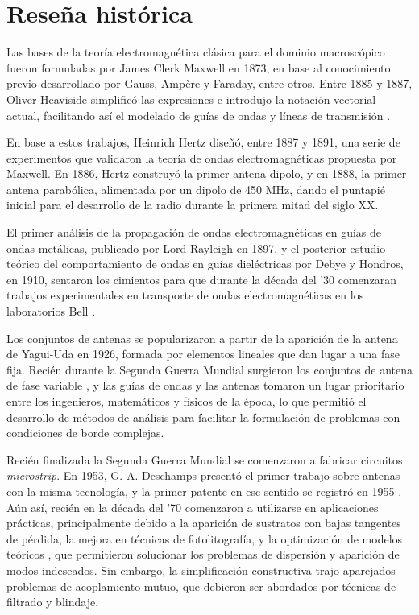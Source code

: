 

\section{Reseña histórica}
\label{sec_intro_resenia}

Las bases de la teoría electromagnética clásica para el dominio macroscópico fueron formuladas por James Clerk Maxwell en 1873, en base al conocimiento previo desarrollado por Gauss, Ampère y Faraday, entre otros. Entre 1885 y 1887, Oliver Heaviside simplificó las expresiones e introdujo la notación vectorial actual, facilitando así el modelado de guías de ondas y líneas de transmisión \cite{Pozar:MwEngineering}.

En base a estos trabajos, Heinrich Hertz diseñó, entre 1887 y 1891, una serie de experimentos que validaron la teoría de ondas electromagnéticas propuesta por Maxwell. En 1886, Hertz construyó la primer antena dipolo, y en 1888, la primer antena parabólica, alimentada por un dipolo de 450 MHz, dando el puntapié inicial para el desarrollo de la radio durante la primera mitad del siglo \textsc{XX}.

El primer análisis de la propagación de ondas electromagnéticas en guías de ondas metálicas, publicado por Lord Rayleigh en 1897, y el posterior estudio teórico del comportamiento de ondas en guías dieléctricas por Debye y Hondros, en 1910, sentaron los cimientos para que durante la década del '30 comenzaran trabajos experimentales en transporte de ondas electromagnéticas en los laboratorios Bell \cite{Collin:GuidedWaves}.

Los conjuntos de antenas se popularizaron a partir de la aparición de la antena de Yagui-Uda en 1926, formada por elementos lineales que dan lugar a una fase fija. Recién durante la Segunda Guerra Mundial surgieron los conjuntos de antena de fase variable \cite{Stutzman:AntennaTheory}, y las guías de ondas y las antenas tomaron un lugar prioritario entre los ingenieros, matemáticos y físicos de la época, lo que permitió el desarrollo de métodos de análisis para facilitar la formulación de problemas con condiciones de borde complejas.

Recién finalizada la Segunda Guerra Mundial se comenzaron a fabricar circuitos \textit{microstrip}. En 1953, G. A. Deschamps presentó el primer trabajo sobre antenas con la misma tecnología, y la primer patente en ese sentido se registró en 1955 \cite{Balanis:Handbook}. Aún así, recién en la década del '70 comenzaron a utilizarse en aplicaciones prácticas, principalmente debido a la aparición de sustratos con bajas tangentes de pérdida, la mejora en técnicas de fotolitografía, y la optimización de modelos teóricos \cite{Barthia:Handbook}, que permitieron solucionar los problemas de dispersión y aparición de modos indeseados. Sin embargo, la simplificación constructiva trajo aparejados problemas de acoplamiento mutuo, que debieron ser abordados por técnicas de filtrado y blindaje.

